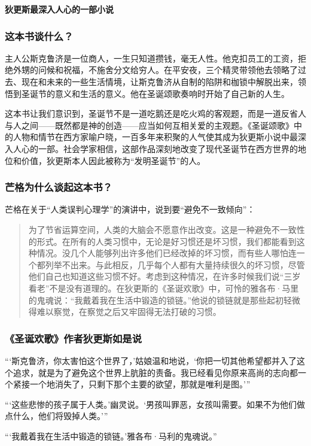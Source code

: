 \cleardoublepage
{}


\begin{BookSummaryBox}
\textbf{狄更斯最深入人心的一部小说}
\par
\end{BookSummaryBox}

\subsubsection*{这本书谈什么？}

主人公斯克鲁济是一位商人，一生只知道攒钱，毫无人性。他克扣员工的工资，拒绝外甥的问候和祝福，不施舍分文给穷人。在平安夜，三个精灵带领他去领略了过去、现在和未来的一些生活情境，让斯克鲁济从自制的陷阱和枷锁中解脱出来，领悟到圣诞节的意义和生活的意义。他在圣诞颂歌奏响时开始了自己新的人生。
\par

这本书让我们意识到，圣诞节不是一道吃鹅还是吃火鸡的客观题，而是一道反省人与人之间——既然都是神的创造——应当如何互相关爱的主观题。《圣诞颂歌》中的人物和情节在西方家喻户晓，一百多年来积聚的人气使其成为狄更斯小说中最深入人心的一部。社会学家相信，这部作品深刻地改变了现代圣诞节在西方世界的地位和价值，狄更斯本人因此被称为“发明圣诞节”的人。
\par

\subsubsection*{芒格为什么谈起这本书？}

芒格在关于“人类误判心理学”的演讲中，说到要“避免不一致倾向”：
\par

\begin{quotation}
为了节省运算空间，人类的大脑会不愿意作出改变。这是一种避免不一致性的形式。在所有的人类习惯中，无论是好习惯还是坏习惯，我们都能看到这种情况。没几个人能够列出许多他们已经改掉的坏习惯，而有些人哪怕连一个都列举不出来。与此相反，几乎每个人都有大量持续很久的坏习惯，尽管他们自己也知道这些习惯不好。考虑到这种情况，在许多时候我们说“三岁看老”不是没有道理的。在狄更斯的《圣诞欢歌》中，可怜的雅各布·马里的鬼魂说：“我戴着我在生活中锻造的锁链。”他说的锁链就是那些起初轻微得难以察觉，在察觉之后又牢固得无法打破的习惯。
\par
\end{quotation}

\subsubsection*{《圣诞欢歌》作者狄更斯如是说}

“‘斯克鲁济，你太害怕这个世界了，’姑娘温和地说，‘你把一切其他希望都并入了这个追求，就是为了避免这个世界上肮脏的责备。我已经看见你原来高尚的志向都一个紧接一个地消失了，只剩下那个主要的欲望，那就是唯利是图。’”
\par

“‘这些悲惨的孩子属于人类。’幽灵说。‘男孩叫罪恶，女孩叫需要。如果不为他们做点什么，他们将毁掉人类。’”
\par

“‘我戴着我在生活中锻造的锁链。’雅各布·马利的鬼魂说。”
\par
